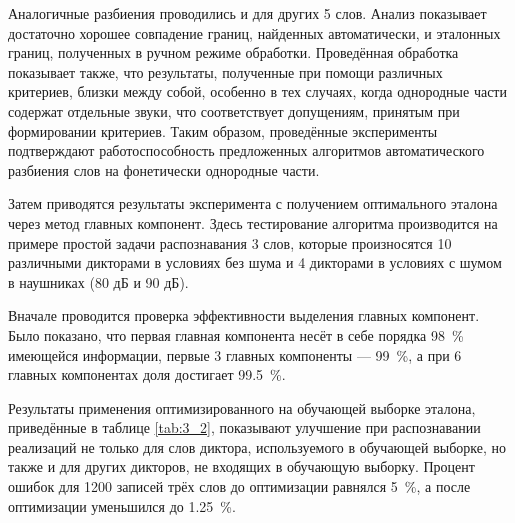 Аналогичные разбиения проводились и для других 5 слов.
Анализ показывает достаточно хорошее совпадение границ, найденных автоматически, и эталонных границ, полученных в ручном режиме обработки.
Проведённая обработка показывает также, что результаты, полученные при помощи различных критериев, близки между собой, особенно в тех случаях, когда однородные части содержат отдельные звуки, что соответствует допущениям, принятым при формировании критериев.
Таким образом, проведённые эксперименты подтверждают работоспособность предложенных алгоритмов автоматического разбиения слов на фонетически однородные части.

Затем приводятся результаты эксперимента с получением оптимального эталона через метод главных компонент.
Здесь тестирование алгоритма производится на примере простой задачи распознавания 3 слов, которые произносятся 10 различными дикторами в условиях без шума и 4 дикторами в условиях с шумом в наушниках (80 дБ и 90 дБ).

Вначале проводится проверка эффективности выделения главных компонент.
Было показано, что первая главная компонента несёт в себе порядка 98~\% имеющейся информации, первые 3 главных компоненты --- 99~\%, а при 6 главных компонентах доля достигает 99.5~\%.

Результаты применения оптимизированного на обучающей выборке эталона, приведённые в таблице \ref{tab:3_2}, показывают улучшение при распознавании реализаций не только для слов диктора, используемого в обучающей выборке, но также и для других дикторов, не входящих в обучающую выборку.
Процент ошибок для 1200 записей трёх слов до оптимизации равнялся 5~\%, а после оптимизации уменьшился до 1.25~\%.

